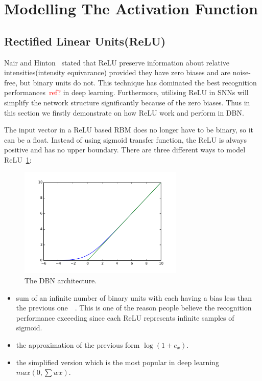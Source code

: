 \section{Modelling The Activation Function}
	\subsection{Rectified Linear Units(ReLU)}
	Nair and Hinton~\cite{nair2010rectified} stated that ReLU preserve information about relative intensities(intensity equivarance) provided they have zero biases and are noise-free, but binary units do not.
	This technique has dominated the best recognition performances~\textcolor{red}{ref?} in deep learning.
	Furthermore, utilising ReLU in SNNs will simplify the network structure significantly because of the zero biases.
	Thus in this section we firstly demonstrate on how ReLU work and perform in DBN.
	
	The input vector in a ReLU based RBM does no longer have to be binary, so it can be a float.
	Instead of using sigmoid transfer function, the ReLU is always positive and has no upper boundary.
	There are three different ways to model ReLU~\ref{Fig:relu_tranf}:
	\begin{figure}[hbt]
		\centering
		\includegraphics[width=0.7\textwidth]{pics_sdbn/relu.pdf}
		\caption{The DBN architecture.} 
		\label{Fig:relu_tranf}
	\end{figure}
	\begin{itemize}
		\item sum of an infinite number of binary units with each having a bias less than the previous one~~\cite{nair2010rectified}.
		This is one of the reason people believe the recognition performance exceeding since each ReLU represents infinite samples of sigmoid. 
		\item the approximation of the previous form $\log(1+e_x)$.
		\item the simplified version which is the most popular in deep learning $max(0,\sum w x)$.
	\end{itemize}  

